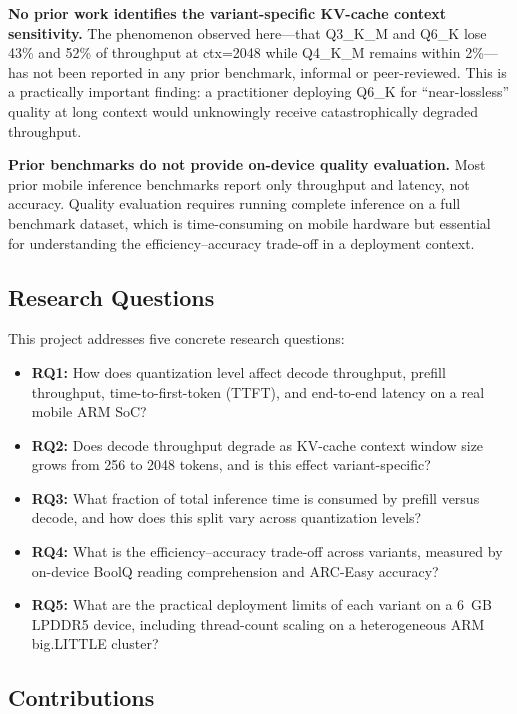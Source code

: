 \documentclass[conference]{IEEEtran}
\begin{document}
\textbf{No prior work identifies the variant-specific KV-cache context
sensitivity.} The phenomenon observed here---that Q3\_K\_M and Q6\_K lose 43\%
and 52\% of throughput at ctx=2048 while Q4\_K\_M remains within 2\%---has not
been reported in any prior benchmark, informal or peer-reviewed. This is a
practically important finding: a practitioner deploying Q6\_K for ``near-lossless''
quality at long context would unknowingly receive catastrophically degraded
throughput.

\textbf{Prior benchmarks do not provide on-device quality evaluation.} Most
prior mobile inference benchmarks report only throughput and latency, not
accuracy. Quality evaluation requires running complete inference on a full
benchmark dataset, which is time-consuming on mobile hardware but essential
for understanding the efficiency--accuracy trade-off in a deployment context.

\subsection{Research Questions}

This project addresses five concrete research questions:

\begin{itemize}
  \item \textbf{RQ1:} How does quantization level affect decode throughput, prefill
        throughput, time-to-first-token (TTFT), and end-to-end latency on a
        real mobile ARM SoC?
  \item \textbf{RQ2:} Does decode throughput degrade as KV-cache context window
        size grows from 256 to 2048 tokens, and is this effect variant-specific?
  \item \textbf{RQ3:} What fraction of total inference time is consumed by prefill
        versus decode, and how does this split vary across quantization levels?
  \item \textbf{RQ4:} What is the efficiency--accuracy trade-off across variants,
        measured by on-device BoolQ reading comprehension and ARC-Easy accuracy?
  \item \textbf{RQ5:} What are the practical deployment limits of each variant
        on a 6~GB LPDDR5 device, including thread-count scaling on a
        heterogeneous ARM big.LITTLE cluster?
\end{itemize}

\subsection{Contributions}
\end{document}
